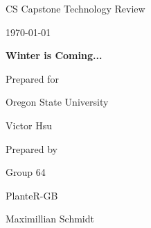 \documentclass[onecolumn, draftclsnofoot,10pt, compsoc]{IEEEtran}
\def \CapstoneTeamName{			              			 PlanteR-GB}
\def \CapstoneTeamNumber{					           			 Group 64}
\def \GroupMemberOne{				           				Austin Hodgin}
\def \GroupMemberTwo{				           				Travis Hodgin}
\def \GroupMemberThree{			            Maximillian Schmidt}
\def \GroupMemberFour{		        	             Zach Lerew}
\def \CapstoneProjectName{	      	    Winter is Coming...}
\def \CapstoneSponsorCompany{		    Oregon State University}
\def \CapstoneSponsorPerson{		 			  				 Victor Hsu}
\def \DocType{		%
				Technology Review
				}
\newcommand{\NameSigPair}[1]{\par
\makebox[2.75in][r]{#1} \hfil 	\makebox[3.25in]{\makebox[2.25in]{\hrulefill} \hfill		\makebox[.75in]{\hrulefill}}
\par\vspace{-12pt} \textit{\tiny\noindent
\makebox[2.75in]{} \hfil		\makebox[3.25in]{\makebox[2.25in][r]{Signature} \hfill	\makebox[.75in][r]{Date}}}}
\renewcommand{\NameSigPair}[1]{#1}
\begin{document}
\begin{titlepage}
    \begin{singlespace}
        \hfill


        \par\vspace{.2in}
        \centering
        \scshape{
            \huge CS Capstone \DocType \par
            {\large\today}\par
            \vspace{.5in}
            \textbf{\Huge\CapstoneProjectName}\par

						\vspace{1in}

            {\large Prepared for}\par
            \Huge \CapstoneSponsorCompany\par
            \vspace{5pt}
            {\Large\NameSigPair{\CapstoneSponsorPerson}\par}

						\vspace{1in}

            {\large Prepared by}\par
						{\huge \CapstoneTeamNumber}\par
            \CapstoneTeamName\par
            \vspace{5pt}

            {
							\Large
							\NameSigPair{\GroupMemberThree}\par
            }

            \vspace{20pt}
        }

				\newpage
        \begin{abstract}
				\noindent In later versions of the end product, the system expands and starts offering the ability to connect other devices to the main controller.  A network
				will be needed for such communication.  This will allow multiple users to be able to control the LEDs.  Further designs lead to advanced lighting of the planter box,
				which will require custom fittings.  All of this will not be possible without a core Control Service which controls everything from user input to LED control.  Taking into
				consideration each of these systems, this document will cover three technologies for the following areas: network structures, custom planter box hardware, and the core control
				service language.  
        \end{abstract}
    \end{singlespace}
\end{titlepage}
\end{document}
